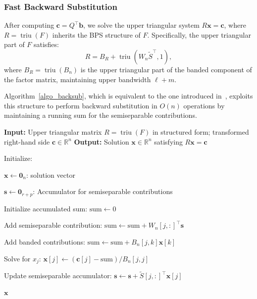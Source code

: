 \documentclass[a4paper,fleqn]{cas-sc}
\DeclareMathOperator{\triu}{triu}
\begin{document}
\subsubsection{Fast Backward Substitution}

After computing \( \mathbf{c} = Q^\top \mathbf{b} \), we solve the upper triangular system \( R\mathbf{x} = \mathbf{c} \), where \( R = \triu(F) \) inherits the BPS structure of \( F \). Specifically, the upper triangular part of \( F \) satisfies:
\[
R = B_R + \triu(W_n \tilde S^\top, 1),
\]
where \( B_R = \triu(B_n) \) is the upper triangular part of the banded component of the factor matrix, maintaining upper bandwidth \( \ell+m \).

Algorithm~\ref{algo_backsub}, which is equivalent to the one introduced in~\cite{olver2013fast}, exploits this structure to perform backward substitution in \( O(n) \) operations by maintaining a running sum for the semiseparable contributions.

\begin{algorithm}
\caption{Fast Backward Substitution for Structured \( R \)}\label{algo_backsub}
\begin{algorithmic}
\State \textbf{Input:} Upper triangular matrix \( R = \triu(F) \) in structured form; transformed right-hand side \( \mathbf{c} \in \mathbb{R}^n \)
\State \textbf{Output:} Solution \( \mathbf{x} \in \mathbb{R}^n \) satisfying \( R\mathbf{x} = \mathbf{c} \)

\State Initialize:

\( \mathbf{x} \gets \mathbf{0}_n \): solution vector

\( \mathbf{s} \gets \mathbf{0}_{r+p} \): Accumulator for semiseparable contributions


    \State Initialize  accumulated sum: \( \text{sum} \gets 0 \)

    \State Add semiseparable contribution: \( \text{sum} \gets \text{sum} + W_n[j,:]^\top \mathbf{s} \)

    \State Add banded contributions:
        \State \( \text{sum} \gets \text{sum} + B_n[j,k]  \mathbf{x}[k] \)
    \EndFor

    \State Solve for \( x_j \): \( \mathbf{x}[j] \gets (\mathbf{c}[j] - \text{sum}) / B_n[j,j] \)

    \State Update semiseparable accumulator: \( \mathbf{s} \gets \mathbf{s} + \tilde S[j,:]^\top \mathbf{x}[j] \)
\EndFor

\State \Return \( \mathbf{x} \)
\end{algorithmic}
\end{algorithm}
\end{document}
